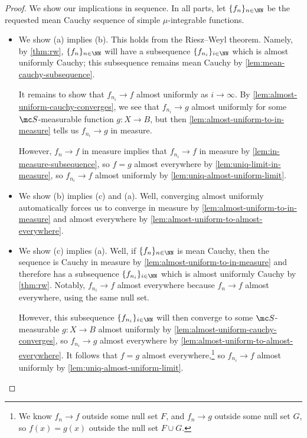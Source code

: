 \documentclass[../notes.tex]{subfiles}
\begin{document}
\begin{proof}
	We show our implications in sequence. In all parts, let $\{f_n\}_{n\in\NN}$ be the requested mean Cauchy sequence of simple $\mu$-integrable functions.
	\begin{itemize}
		\item We show (a) implies (b). This holds from the Riesz--Weyl theorem. Namely, by \autoref{thm:rw}, $\{f_n\}_{n\in\NN}$ will have a subsequence $\{f_{n_i}\}_{i\in\NN}$ which is almost uniformly Cauchy; this subsequence remains mean Cauchy by \autoref{lem:mean-cauchy-subsequence}.

		It remains to show that $f_{n_i}\to f$ almost uniformly as $i\to\infty$. By \autoref{lem:almost-uniform-cauchy-converges}, we see that $f_{n_i}\to g$ almost uniformly for some $\mc S$-measurable function $g\colon X\to B$, but then \autoref{lem:almost-uniform-to-in-measure} tells us $f_{n_i}\to g$ in measure.

		However, $f_n\to f$ in measure implies that $f_{n_i}\to f$ in measure by \autoref{lem:in-measure-subsequence}, so $f=g$ almost everywhere by \autoref{lem:uniq-limit-in-measure}, so $f_{n_i}\to f$ almost uniformly by \autoref{lem:uniq-almost-uniform-limit}.
		\item We show (b) implies (c) and (a). Well, converging almost uniformly automatically forces us to converge in measure by \autoref{lem:almost-uniform-to-in-measure} and almost everywhere by \autoref{lem:almost-uniform-to-almost-everywhere}.
		\item We show (c) implies (a). Well, if $\{f_n\}_{n\in\NN}$ is mean Cauchy, then the sequence is Cauchy in measure by \autoref{lem:almost-uniform-to-in-measure} and therefore has a subsequence $\{f_{n_i}\}_{i\in\NN}$ which is almost uniformly Cauchy by \autoref{thm:rw}. Notably, $f_{n_i}\to f$ almost everywhere because $f_n\to f$ almost everywhere, using the same null set.
		
		However, this subsequence $\{f_{n_i}\}_{i\in\NN}$ will then converge to some $\mc S$-measurable $g\colon X\to B$ almost uniformly by \autoref{lem:almost-uniform-cauchy-converges}, so $f_{n_i}\to g$ almost everywhere by \autoref{lem:almost-uniform-to-almost-everywhere}. It follows that $f=g$ almost everywhere,\footnote{We know $f_n\to f$ outside some null set $F$, and $f_n\to g$ outside some null set $G$, so $f(x)=g(x)$ outside the null set $F\cup G$.} so $f_{n_i}\to f$ almost uniformly by \autoref{lem:uniq-almost-uniform-limit}.
		\qedhere
	\end{itemize}
\end{proof}
\end{document}

